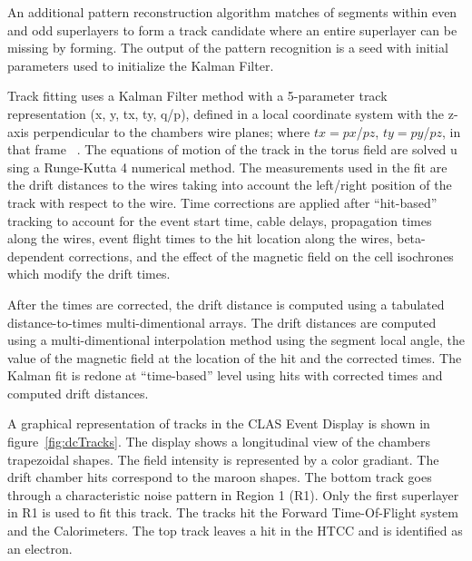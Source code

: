 \documentclass{elsart}
\begin{document}
An additional  pattern reconstruction algorithm  matches of segments within even and odd superlayers to form
a track candidate where an entire superlayer can be missing by forming. The output of the pattern recognition
is a seed with initial parameters used to initialize the Kalman Filter.

Track fitting uses a Kalman Filter method with a 5-parameter track representation (x, y, tx, ty, q/p), defined
in a local coordinate system with the z-axis perpendicular to the chambers wire planes; where $tx=px$/$pz$,
$ty=py$/$pz$, in that frame~\cite{spiri} .  The equations of motion of the track in the torus field are solved u
sing a Runge-Kutta 4 numerical method.  The measurements used in the fit are the drift distances to the wires
taking into account the left/right position of the track with respect to the wire. Time corrections are applied
after ``hit-based'' tracking to account for the event start time, cable delays, propagation times along
the wires, event flight times to the hit location along the wires, beta-dependent corrections, and the effect of
the magnetic field on the cell isochrones which modify the drift times.  

After the times are corrected, the drift distance is computed using a tabulated distance-to-times
multi-dimentional arrays.  The drift distances are computed using a multi-dimentional interpolation method
using the segment local angle, the value of the magnetic field at the location of the hit and the corrected
times.  The Kalman fit is redone at ``time-based'' level using hits with corrected times and computed drift
distances. 

A graphical representation of tracks in the CLAS Event Display is shown in figure~\ref{fig:dcTracks}.  The
display shows a longitudinal view of the chambers trapezoidal shapes. The field intensity is represented by a
color gradiant. The drift chamber hits correspond to the maroon shapes.  The bottom track goes through a
characteristic noise pattern in Region 1 (R1). Only the first superlayer in R1 is used to fit this track.  The tracks hit
the Forward Time-Of-Flight system and the Calorimeters.  The top track leaves a hit in the HTCC and is identified
as an electron. 
\end{document}
